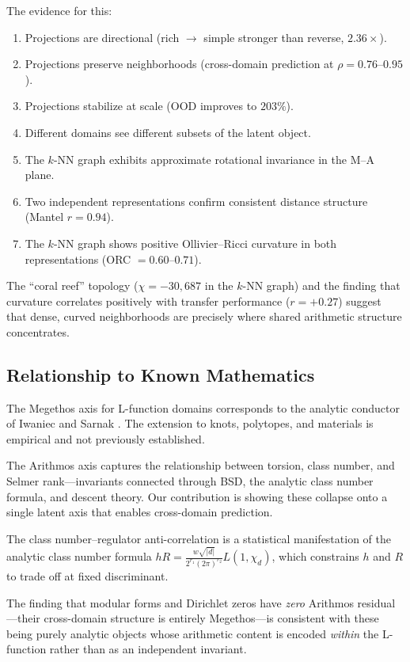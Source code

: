 \documentclass[11pt,a4paper]{article}
\begin{document}
The evidence for this:
\begin{enumerate}[nosep]
    \item Projections are directional (rich $\to$ simple stronger than reverse, $2.36\times$).
    \item Projections preserve neighborhoods (cross-domain prediction at $\rho = 0.76$--$0.95$).
    \item Projections stabilize at scale (OOD improves to $203\%$).
    \item Different domains see different subsets of the latent object.
    \item The $k$-NN graph exhibits approximate rotational invariance in the M--A plane.
    \item Two independent representations confirm consistent distance structure (Mantel $r = 0.94$).
    \item The $k$-NN graph shows positive Ollivier--Ricci curvature in both representations (ORC $= 0.60$--$0.71$).
\end{enumerate}

The ``coral reef'' topology ($\chi = -30{,}687$ in the $k$-NN graph) and the finding that curvature correlates positively with transfer performance ($r = +0.27$) suggest that dense, curved neighborhoods are precisely where shared arithmetic structure concentrates.

\subsection{Relationship to Known Mathematics}

The Megethos axis for L-function domains corresponds to the analytic conductor of Iwaniec and Sarnak \cite{iwaniec2000}. The extension to knots, polytopes, and materials is empirical and not previously established.

The Arithmos axis captures the relationship between torsion, class number, and Selmer rank---invariants connected through BSD, the analytic class number formula, and descent theory. Our contribution is showing these collapse onto a single latent axis that enables cross-domain prediction.

The class number--regulator anti-correlation is a statistical manifestation of the analytic class number formula $h R = \frac{w \sqrt{|d|}}{2^{r_1} (2\pi)^{r_2}} L(1, \chi_d)$, which constrains $h$ and $R$ to trade off at fixed discriminant.

The finding that modular forms and Dirichlet zeros have \emph{zero} Arithmos residual---their cross-domain structure is entirely Megethos---is consistent with these being purely analytic objects whose arithmetic content is encoded \emph{within} the L-function rather than as an independent invariant.
\end{document}
